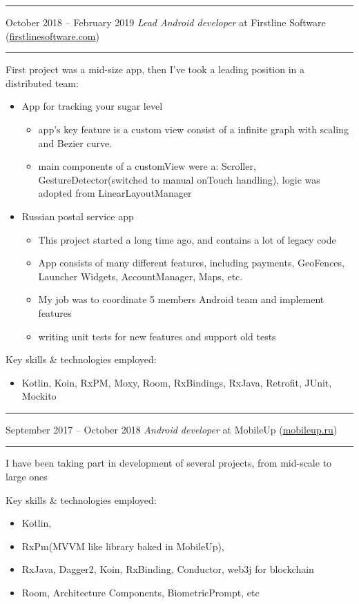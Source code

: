 \documentclass[11pt]{article}
\newcommand\CvSmallSkipLength{0.5em}
\newcommand\CvSkip[1]{\vspace{#1}}
\newcommand\CvSmallSkip{\CvSkip{\CvSmallSkipLength}}
\newcommand\CvRule{\begingroup\color{CvRuleColor}\hrule\endgroup}
\newcommand\CvWorkplaceHeader[5]{\begingroup%
	\CvRule%
	\fboxsep0pt%
	\colorbox{CvWorkplaceHeaderColor}{%
		\begin{minipage}{\linewidth-2\fboxsep}%
			\CvSmallSkip%
			#1 -- #2 \hfill \textit{#3} at #4 (\href{http://#5/}{#5})%
			\CvSmallSkip%
		\end{minipage}%
	}%
	\CvRule%
	\endgroup%
}
\newenvironment{CvWorkplaceDescription}{%
	\begingroup\setlength\parskip{\CvSmallSkipLength}%
}{%
	\CvSmallSkip\endgroup%
}
\begin{document}
	\CvWorkplaceHeader{October 2018}{February 2019}{Lead Android developer}{Firstline Software}{firstlinesoftware.com}
	\begin{CvWorkplaceDescription}
		First project was a mid-size app, then I've took a leading position in a distributed team:
		\begin{itemize}[noitemsep]
			\item App for tracking your sugar level
			\begin{itemize}
				\item  app's key feature is a custom view consist of a infinite graph with scaling and Bezier curve. 
				\item main components of a customView were a: Scroller, GestureDetector(switched to manual onTouch handling), logic was adopted from LinearLayoutManager
			\end{itemize}
			\item Russian postal service app
			\begin{itemize}
				\item  This project started a long time ago, and contains a lot of legacy code
				\item  App consists of many different features, including payments, GeoFences, Launcher Widgets, AccountManager, Maps, etc.
				\item My job was to coordinate 5 members Android team and implement features
				\item writing unit tests for new features and support old tests
			\end{itemize}
		\end{itemize}
		
		Key skills \& technologies employed:
		\begin{itemize}[noitemsep]
			\item Kotlin, Koin, RxPM, Moxy, Room, RxBindings, RxJava, Retrofit, JUnit, Mockito
		\end{itemize}
	\end{CvWorkplaceDescription}
	
	\CvWorkplaceHeader{September 2017}{October 2018}{Android developer}{MobileUp}{mobileup.ru}
	
	\begin{CvWorkplaceDescription}
		I have been taking part in development of several projects, from mid-scale to large ones
		
		Key skills \& technologies employed:
		\begin{itemize}[noitemsep]
			\item Kotlin,
			\item RxPm(MVVM like library baked in MobileUp),
			\item RxJava, Dagger2, Koin, RxBinding, Conductor, web3j for blockchain
			\item Room, Architecture Components, BiometricPrompt, etc
		\end{itemize}
	\end{CvWorkplaceDescription}
	
\end{document}
